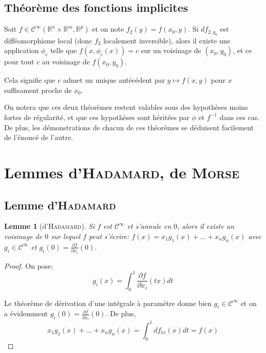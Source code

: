 \documentclass[a4paper]{article}
\newcommand{\cinf}{\mathcal{C}^\infty}
\newcommand{\R}{\mathbb{R}}
\newtheorem{lemm}{Lemme}
\theoremstyle{definition}
\begin{document}

\subsection{Théorème des fonctions implicites}

Soit $f\in\cinf(\R^n\times\R^m,\R^p)$ et on note $f_2(y) = f(x_0, y)$.
Si $df_{2,y_0}$ est difféomorphisme local (donc $f_2$ localement inversible), alors il existe une application $\phi_c$ telle que $f(x,\phi_c(x))=c$ sur un voisinage de $(x_0,y_0)$, et ce pour tout $c$ au voisinage de $f(x_0,y_0)$.

Cela signifie que $c$ admet un unique antécédent par $y\mapsto f(x,y)$ pour $x$ suffisament proche de $x_0$.

\bigskip

On notera que ces deux théorèmes restent valables sous des hypothèses moins fortes de régularité, et que ces hypothèses sont héritées par $\phi$ et $f^{-1}$ dans ces cas.
De plus, les démonstrations de chacun de ces théorèmes se déduisent facilement de l'énoncé de l'autre.

\section{Lemmes d'\textsc{Hadamard}, de \textsc{Morse}}

\subsection{Lemme d'\textsc{Hadamard}}
\begin{lemm}[d'\textsc{Hadamard}]
	Si $f$ est $\cinf$ et s'annule en $0$, alors il existe un voisinage de $0$ sur lequel $f$ peut s'écrire: $f(x)=x_1g_1(x)+...+x_ng_n(x)$ avec $g_i\in\cinf$ et $g_i(0) = \frac{\partial f}{\partial x_i}(0)$.
\end{lemm}
\begin{proof}
	On pose:
	$$g_i(x) = \int_0^1 \frac{\partial f}{\partial x_i}(tx)dt$$

	Le théorème de dérivation d'une intégrale à paramétre donne bien $g_i\in\cinf$ et on a évidemment $g_i(0) = \frac{\partial f}{\partial x_i}(0)$.
	De plus,
	$$x_1g_1(x)+...+x_ng_n(x)=\int_0^1 df_{tx}(x) dt = f(x)$$
\end{proof}
\end{document}
